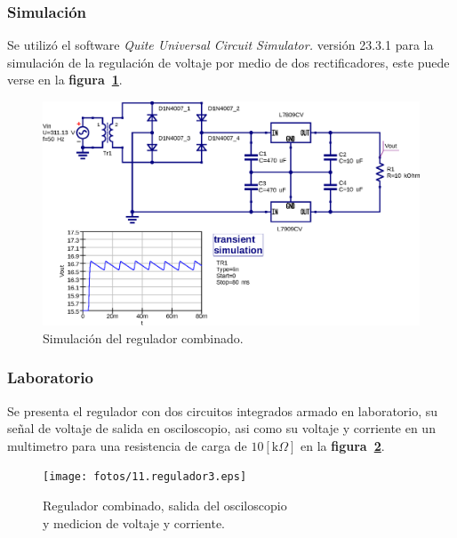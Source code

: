 \subsubsection{Simulación}
Se utilizó el software \emph{Quite Universal Circuit Simulator.} versión 23.3.1
para la simulación de la regulación de voltaje por medio de dos rectificadores,
este puede verse en la \textbf{figura~\ref{simulacion11}}.

\begin{figure}[!h]
\centering
\includegraphics[scale=0.75]{simulacion/11.regulador3.eps}
\caption{Simulación del regulador combinado.}
\label{simulacion11}
\end{figure}

\subsubsection{Laboratorio}
Se presenta el regulador con dos circuitos integrados armado en laboratorio, su
señal de voltaje de salida en osciloscopio, asi como su voltaje y corriente en
un multimetro para una resistencia de carga de $10[\text{k}\Omega]$ en la
\textbf{figura~\ref{laboratorio13}}.

\begin{figure}[!h]
\centering
\texttt{[image: fotos/11.regulador3.eps]}
\caption{Regulador combinado, salida del osciloscopio\\
y medicion de voltaje y corriente.}
\label{laboratorio13}
\end{figure}



